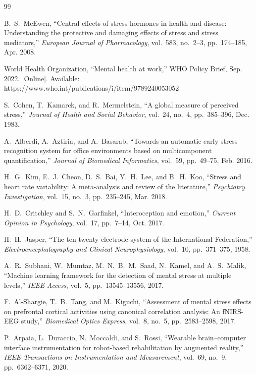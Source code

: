 \documentclass[12pt,letterpaper]{report}
\begin{document}
\begin{thebibliography}{99}

B.~S.~McEwen, ``Central effects of stress hormones in health and disease: Understanding the protective and damaging effects of stress and stress mediators,'' \textit{European Journal of Pharmacology}, vol.~583, no.~2--3, pp.~174--185, Apr. 2008.

World Health Organization, ``Mental health at work,'' WHO Policy Brief, Sep. 2022. [Online]. Available: https://www.who.int/publications/i/item/9789240053052

S.~Cohen, T.~Kamarck, and R.~Mermelstein, ``A global measure of perceived stress,'' \textit{Journal of Health and Social Behavior}, vol.~24, no.~4, pp.~385--396, Dec. 1983.

A.~Alberdi, A.~Aztiria, and A.~Basarab, ``Towards an automatic early stress recognition system for office environments based on multicomponent quantification,'' \textit{Journal of Biomedical Informatics}, vol.~59, pp.~49--75, Feb. 2016.

H.~G.~Kim, E.~J.~Cheon, D.~S.~Bai, Y.~H.~Lee, and B.~H.~Koo, ``Stress and heart rate variability: A meta-analysis and review of the literature,'' \textit{Psychiatry Investigation}, vol.~15, no.~3, pp.~235--245, Mar. 2018.

H.~D.~Critchley and S.~N.~Garfinkel, ``Interoception and emotion,'' \textit{Current Opinion in Psychology}, vol.~17, pp.~7--14, Oct. 2017.

H.~H.~Jasper, ``The ten-twenty electrode system of the International Federation,'' \textit{Electroencephalography and Clinical Neurophysiology}, vol.~10, pp.~371--375, 1958.

A.~R.~Subhani, W.~Mumtaz, M.~N.~B.~M.~Saad, N.~Kamel, and A.~S.~Malik, ``Machine learning framework for the detection of mental stress at multiple levels,'' \textit{IEEE Access}, vol.~5, pp.~13545--13556, 2017.

F.~Al-Shargie, T.~B.~Tang, and M.~Kiguchi, ``Assessment of mental stress effects on prefrontal cortical activities using canonical correlation analysis: An fNIRS-EEG study,'' \textit{Biomedical Optics Express}, vol.~8, no.~5, pp.~2583--2598, 2017.

P.~Arpaia, L.~Duraccio, N.~Moccaldi, and S.~Rossi, ``Wearable brain--computer interface instrumentation for robot-based rehabilitation by augmented reality,'' \textit{IEEE Transactions on Instrumentation and Measurement}, vol.~69, no.~9, pp.~6362--6371, 2020.


\end{thebibliography}
\end{document}
